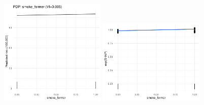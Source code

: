 \documentclass[12pt]{article}
\begin{document}
\begin{figure}[h]
\centering
\includegraphics[width=0.45\textwidth]{figures/pdp_new/smoke_former.pdf}
\includegraphics[width=0.45\textwidth]{figures/shap_new/smoke_former.pdf}
\end{figure}
\end{document}
